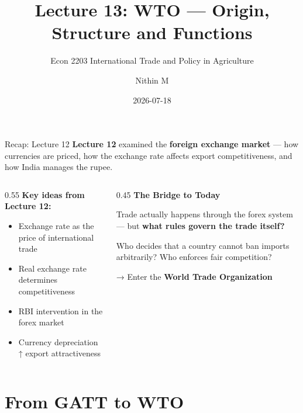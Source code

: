 \documentclass[
  ignorenonframetext,
  aspectratio=169,
]{beamer}
\title[L13 \textbar{} WTO]{Lecture 13: WTO --- Origin, Structure and
Functions}
\subtitle{Econ 2203 \textbar{} International Trade and Policy in
Agriculture}
\author{Nithin M}
\date{2026-07-18}
\institute{Department of Development Economics}
\makeatletter
\providecommand{\tightlist}{%
  \setlength{\itemsep}{0pt}\setlength{\parskip}{0pt}}
\let\quarto@originallabel\label
\DeclareRobustCommand*{\label}[1]{\quarto@originallabel{#1}}
\makeatother
\begin{document}
\frame{\titlepage}


\begin{frame}{Recap: Lecture 12}
\label{recap-lecture-12}
\textbf{Lecture 12} examined the \textbf{foreign exchange market} ---
how currencies are priced, how the exchange rate affects export
competitiveness, and how India manages the rupee.

\begin{columns}[T]
\begin{column}{0.55\linewidth}
\textbf{Key ideas from Lecture 12:}

\begin{itemize}
\tightlist
\item
  Exchange rate as the price of international trade
\item
  Real exchange rate determines competitiveness
\item
  RBI intervention in the forex market
\item
  Currency depreciation ↑ export attractiveness
\end{itemize}
\end{column}

\begin{column}{0.45\linewidth}
\textbf{The Bridge to Today}

Trade actually happens through the forex system --- but \textbf{what
rules govern the trade itself?}

Who decides that a country cannot ban imports arbitrarily? Who enforces
fair competition?

→ Enter the \textbf{World Trade Organization}
\end{column}
\end{columns}
\end{frame}

\begin{frame}
\end{frame}

\section{From GATT to WTO}\label{from-gatt-to-wto}
\end{document}
